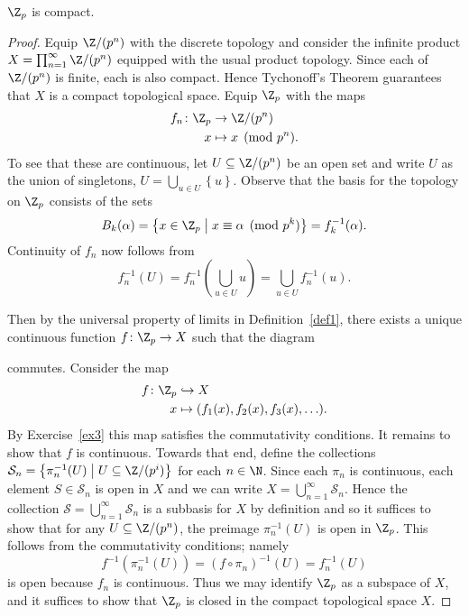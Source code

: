 \documentclass[10pt]{amsart}
\begin{document}
\setcounter{thm}{6}
\begin{thm}
  $\Z_p$ is compact.

  \begin{proof}
    Equip $\Z/(p^n)$ with the discrete topology and consider the infinite product $X = \prod_{n=1}^\infty \Z/(p^n)$ equipped with the usual product topology.
    Since each of $\Z/(p^n)$ is finite, each is also compact.
    Hence Tychonoff's Theorem guarantees that $X$ is a compact topological space.
    Equip $\Z_p$ with the maps
    \begin{align*}
      f_n \colon \Z_p  &\rightarrow \Z/(p^n)\\
      x &\mapsto x \pmod{p^n}.
    \end{align*}
    To see that these are continuous, let $U \subseteq \Z/(p^n)$ be an open set and write $U$ as the union of singletons, $U = \bigcup_{u \in U}\left\{u\right\}$.
    Observe that the basis for the topology on $\Z_p$ consists of the sets
    $$B_k(\alpha) = \left\{x \in \Z_p \;\middle\vert\; x \equiv \alpha \pmod{p^k}\right\} = f_k^{-1}(\alpha).$$
    Continuity of $f_n$ now follows from $$f_n^{-1}(U) = f_n^{-1}\left(\bigcup_{u \in U} u\right) = \bigcup_{u \in U} f_n^{-1}(u).$$
    
    Then by the universal property of limits in Definition~\ref{def1}, there exists a unique continuous function $f \colon \Z_p \rightarrow X$ such that the diagram 
    \begin{center}
    \end{center}  
    commutes.
    Consider the map     
    \begin{align*}
      f \colon \Z_p &\hookrightarrow X\\
      x &\mapsto (f_1(x), f_2(x), f_3(x), \ldots).
    \end{align*}
    By Exercise~\ref{ex3} this map satisfies the commutativity conditions.
    It remains to show that $f$ is continuous.
    Towards that end, define the collections $\mathcal{S}_n = \left\{\pi_n^{-1}(U) \;\middle\vert\; U \subseteq \Z/(p^i) \right\}$ for each $n \in \N$.
    Since each $\pi_n$ is continuous, each element $S \in \mathcal{S}_n$ is open in $X$ and we can write $X = \bigcup_{n=1}^\infty \mathcal{S}_n$.
    Hence the collection $\mathcal{S} = \bigcup_{n=1}^\infty \mathcal{S}_n$ is a subbasis for $X$ by definition and so it suffices to show that for any $U \subseteq \Z/(p^n)$, the preimage $\pi_n^{-1}(U)$ is open in $\Z_p$.
    This follows from the commutativity conditions; namely 
    $$f^{-1}(\pi_n^{-1}(U)) = (f \circ \pi_n)^{-1}(U) = f_n^{-1}(U)$$
    is open because $f_n$ is continuous.
    Thus we may identify $\Z_p$ as a subspace of $X$, and it suffices to show that $\Z_p$ is closed in the compact topological space $X$.
    

\end{proof}
\end{thm}
\end{document}

